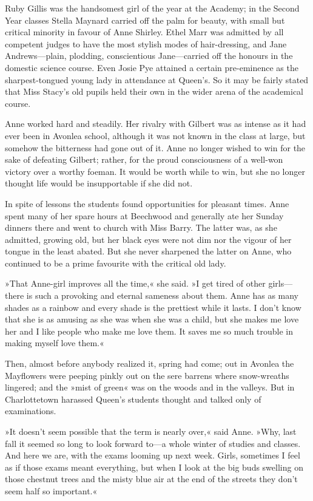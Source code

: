 Ruby Gillis was the handsomest girl of the year at the Academy; in the Second Year classes Stella Maynard carried off the palm for beauty, with small but critical minority in favour of Anne Shirley. Ethel Marr was admitted by all competent judges to have the most stylish modes of hair-dressing, and Jane Andrews—plain, plodding, conscientious Jane—carried off the honours in the domestic science course. Even Josie Pye attained a certain pre-eminence as the sharpest-tongued young lady in attendance at Queen’s. So it may be fairly stated that Miss Stacy’s old pupils held their own in the wider arena of the academical course.

Anne worked hard and steadily. Her rivalry with Gilbert was as intense as it had ever been in Avonlea school, although it was not known in the class at large, but somehow the bitterness had gone out of it. Anne no longer wished to win for the sake of defeating Gilbert; rather, for the proud consciousness of a well-won victory over a worthy foeman. It would be worth while to win, but she no longer thought life would be insupportable if she did not.

In spite of lessons the students found opportunities for pleasant times. Anne spent many of her spare hours at Beechwood and generally ate her Sunday dinners there and went to church with Miss Barry. The latter was, as she admitted, growing old, but her black eyes were not dim nor the vigour of her tongue in the least abated. But she never sharpened the latter on Anne, who continued to be a prime favourite with the critical old lady.

»That Anne-girl improves all the time,« she said. »I get tired of other girls—there is such a provoking and eternal sameness about them. Anne has as many shades as a rainbow and every shade is the prettiest while it lasts. I don’t know that she is as amusing as she was when she was a child, but she makes me love her and I like people who make me love them. It saves me so much trouble in making myself love them.«

Then, almost before anybody realized it, spring had come; out in Avonlea the Mayflowers were peeping pinkly out on the sere barrens where snow-wreaths lingered; and the »mist of green« was on the woods and in the valleys. But in Charlottetown harassed Queen’s students thought and talked only of examinations.

»It doesn’t seem possible that the term is nearly over,« said Anne. »Why, last fall it seemed so long to look forward to—a whole winter of studies and classes. And here we are, with the exams looming up next week. Girls, sometimes I feel as if those exams meant everything, but when I look at the big buds swelling on those chestnut trees and the misty blue air at the end of the streets they don’t seem half so important.«

